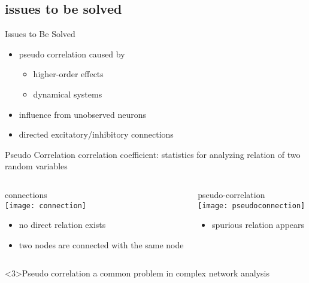 \documentclass[fleqn,aspectratio=1610]{beamer}
\begin{document}
\subsection{issues to be solved}
\label{sec:org2ed6258}
\begin{frame}[label={sec:orgb5483e8}]{Issues to Be Solved}
\begin{itemize}
\item pseudo correlation caused by
\begin{itemize}
\item higher-order effects
\item dynamical systems
\end{itemize}
\item influence from unobserved neurons
\item directed excitatory/inhibitory connections
\end{itemize}
\end{frame}

\begin{frame}[label={sec:orgcfae093}]{Pseudo Correlation}
correlation coefficient:
statistics for analyzing relation of two random variables
\medskip
\begin{columns}
\begin{column}[t]{0.5\columnwidth}
\centering
connections \\[4pt]
\texttt{[image: connection]}

\begin{itemize}
\item no direct relation exists
\item two nodes are connected with the same node
\end{itemize}
\pause
\end{column}
\begin{column}[t]{0.5\columnwidth}
\centering
pseudo-correlation \\[4pt]
\texttt{[image: pseudoconnection]}

\begin{itemize}
\item spurious relation appears
\end{itemize}
\end{column}
\end{columns}
\begin{alertblock}<3>{Pseudo correlation}
a common problem in complex network analysis
\end{alertblock}
\end{frame}
\end{document}
